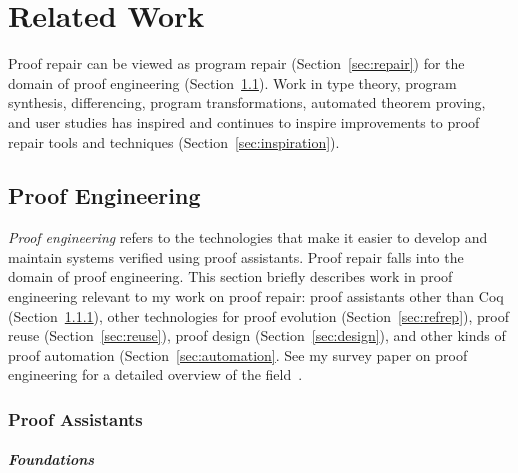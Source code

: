 \chapter{Related Work}
\label{sec:related}


Proof repair can be viewed as program repair (Section~\ref{sec:repair})
for the domain of proof engineering (Section~\ref{sec:proofeng}).
Work in type theory, program synthesis, differencing, program transformations, automated theorem proving, and user studies
has inspired and continues to inspire improvements to proof repair tools and techniques (Section~\ref{sec:inspiration}).

\section{Proof Engineering}
\label{sec:proofeng}

\textit{Proof engineering} refers to the technologies that make it easier to develop and maintain
systems verified using proof assistants.
Proof repair falls into the domain of proof engineering.
This section briefly describes work in proof engineering relevant to my work on proof repair:
proof assistants other than Coq (Section~\ref{sec:ass}),
other technologies for proof evolution (Section~\ref{sec:refrep}),
proof reuse (Section~\ref{sec:reuse}),
proof design (Section~\ref{sec:design}),
and other kinds of proof automation (Section~\ref{sec:automation}.
See my survey paper on proof engineering for a detailed overview of the field~\cite{PGL-045}. %

\subsection{Proof Assistants}
\label{sec:ass}




\paragraph{Foundations} %

